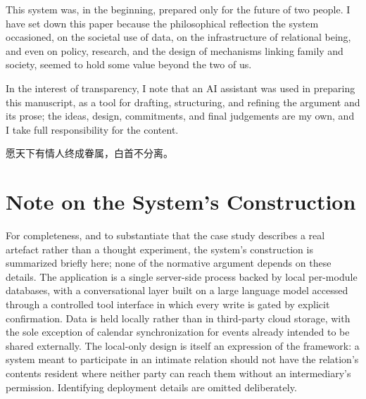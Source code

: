 This system was, in the beginning, prepared only for the future of two people. I have set down this paper because the philosophical reflection the system occasioned, on the societal use of data, on the infrastructure of relational being, and even on policy, research, and the design of mechanisms linking family and society, seemed to hold some value beyond the two of us. 

In the interest of transparency, I note that an AI assistant was used in preparing this manuscript, as a tool for drafting, structuring, and refining the argument and its prose; the ideas, design, commitments, and final judgements are my own, and I take full responsibility for the content.

\begin{center}
{\cjkfont\color{rosedeep} 愿天下有情人终成眷属，白首不分离。}
\end{center}

\appendix
\section{Note on the System's Construction}\label{p01:sec:appendix-technical}

For completeness, and to substantiate that the case study describes a real artefact rather than a thought experiment, the system's construction is summarized briefly here; none of the normative argument depends on these details. The application is a single server-side process backed by local per-module databases, with a conversational layer built on a large language model accessed through a controlled tool interface in which every write is gated by explicit confirmation. Data is held locally rather than in third-party cloud storage, with the sole exception of calendar synchronization for events already intended to be shared externally. The local-only design is itself an expression of the framework: a system meant to participate in an intimate relation should not have the relation's contents resident where neither party can reach them without an intermediary's permission. Identifying deployment details are omitted deliberately.
